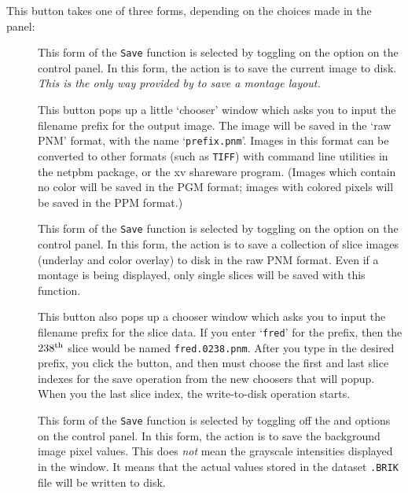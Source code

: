 This button takes one of three forms, depending on the choices
made in the  panel:
\begin{description}
  \item[\blob{}]
   This form of the {\tt Save} function
   is selected by toggling on the  option on the 
   control panel.
   In this form, the action is to save the current image to disk.  {\it This is
   the only way provided by \afnit to save a montage layout.}

   This button pops up a little `chooser' window which asks you to input
   the filename prefix for the output image.  The image will be saved
   in the `raw PNM' format, with the name `{\tt prefix.pnm}'.
   Images in this format can be converted to other formats (such as {\tt TIFF})
   with command line utilities
   in the {\sf netpbm} package, or the {\sf xv} shareware program.
   (Images which contain no color will be saved in the PGM format; images
    with colored pixels will be saved in the PPM format.)

  \item[\blob{}]
   This form of the {\tt Save} function
   is selected by toggling on the  option on the 
   control panel.
   In this form, the action is to save a collection of slice images (underlay
   and color overlay) to disk in
   the raw PNM format.  Even if a montage is being displayed, only
   single slices will be saved with this function.

   This button also pops up a chooser window which asks you to input the
   filename prefix for the slice data.  If you enter `{\tt fred}' for the prefix,
   then the $238^{\rm th}$ slice would be named {\tt fred.0238.pnm}.
   After you type in the desired prefix, you click the  button,
   and then must choose the first and last slice indexes for the save operation
   from the new choosers that will popup.
   When you  the last slice index, the write-to-disk operation starts.

  \item[\blob{}]
   This form of the {\tt Save} function
   is selected by toggling off the  and
    options on the  control panel.
   In this form, the action is to save the background image
   pixel values.  This does {\it not\/} mean the grayscale intensities displayed in
   the window.  It means that the actual values stored in the dataset {\tt .BRIK}
   file will be written to disk.


\end{description}
